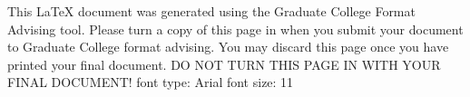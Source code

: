 \documentclass[oneside,12pt]{memoir}
\begin{document}

\newpage	
This LaTeX document was generated using the Graduate College Format Advising tool. Please turn a copy of this page in when you submit your document to Graduate College format advising. You may discard this page once you have printed your final document. DO NOT TURN THIS PAGE IN WITH YOUR FINAL DOCUMENT! 
font type: Arial
font size: 11
\end{document}
